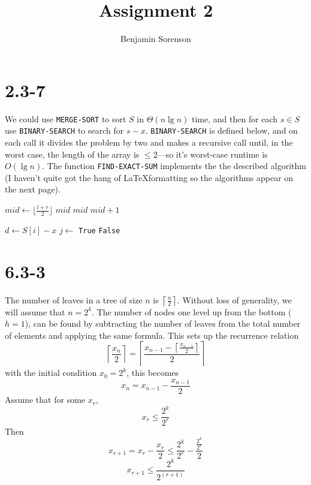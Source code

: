 \documentclass[11pt]{article}
\begin{document}
\author{Benjamin Sorenson} \title{Assignment 2}
\maketitle


\section{2.3-7}

We could use \texttt{MERGE-SORT} to sort \(S\)
in \(\Theta(n\lg n)\)
time, and then for each \(s \in S\)
use \texttt{BINARY-SEARCH} to search for \(s-x\).
\texttt{BINARY-SEARCH} is defined below, and on each call it divides
the problem by two and makes a recursive call until, in the worst
case, the length of the array is \( \le 2\)---so
it's worst-case runtime is \( O( \lg n)\).
The function \texttt{FIND-EXACT-SUM} implements the the described
algorithm (I haven't quite got the hang of \LaTeX formatting so the algorithms appear on the next page).

\begin{algorithm}
  \begin{algorithmic}
     \State
    $mid \gets \lfloor \frac{l + r}{2} \rfloor$
     \State \Return $mid$ \EndIf
    \State \Return $mid$ \Else
    \State \Return $mid + 1$\EndIf\EndIf {}
    \State \Return {} \EndIf
     \State \Return
     \EndIf
    \EndFunction
  \end{algorithmic}
  \begin{algorithmic}
    \State {}
     \State
    $d \gets S\left[i\right]- x$ \State
    $j \gets $
     \State \Return \texttt{True}\EndIf
    \EndFor
    \State \Return \texttt{False}
    \EndFunction
  \end{algorithmic}
\end{algorithm}
\section{6.3-3}
The number of leaves in a tree of size \(n\)
is \(\left\lceil \frac{n}{2}\right\rceil\).
Without loss of generality, we will assume that \(n = 2^k\).
The number of nodes one level up from the bottom (\(h=1\)),
can be found by subtracting the number of leaves from the total number
of elements and applying the same formula. This sets up the recurrence
relation
\[\left\lceil\frac{ x_n}{2}\right\rceil = \left\lceil\frac{x_{n-1} - \left\lceil \frac{x_{n-1}}{2}
    \right\rceil}{2} \right\rceil\]
with the initial condition \(x_0 = 2^k\), this becomes
\[x_n = x_{n-1} - \frac{x_{n-1}}{2}\]
Assume that for some \(x_r\), \[x_r \le \frac{2^k}{2^{r}}\] Then
\[x_{r+1} = x_r - \frac{x_r}{2} \le
\frac{2^k}{2^{r}} - \frac{\frac{2^k}{2^{r}}}{2}\]
\[x_{r+1} \le \frac{2^k}{2^{(r+1)}} \]
\end{document}
